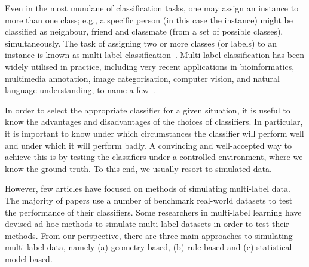\documentclass[review]{elsarticle}
\begin{document}
	Even in the most mundane of classification tasks, one may assign an instance to more than one class; e.g., a specific person (in this case the instance) might be classified as neighbour, friend and classmate (from a set of possible classes), simultaneously. The task of assigning two or more classes (or labels) to an instance is known as multi-label classification~\citep{Tsoumakas:07, de2009tutorial, zhang2014review, Gibaja:15}. Multi-label classification has been widely utilised in practice, including very recent applications in bioinformatics, multimedia annotation, image categorisation, computer vision, and natural language understanding, to name a few~\citep{Tsoumakas:07, zhang2014review, meng2016plant, li2016conditional, hou2016multi, ivasic2016two, wu2015multi, zhao2015multi, zhao2015joint, yang2016exploiting, li2015supervised, li2015centroid}.
	
	In order to select the appropriate classifier for a given situation, it is useful to know the advantages and disadvantages of the choices of classifiers. In particular, it is important to know under which circumstances the classifier will perform well and under which it will perform badly. A convincing and well-accepted way to achieve this is by testing the classifiers under a controlled environment, where we know the ground truth. To this end, we usually resort to simulated data.
	
	However, few articles have focused on methods of simulating multi-label data. The majority of papers use a number of benchmark real-world datasets to test the performance of their classifiers. Some researchers in multi-label learning have devised ad hoc methods to simulate multi-label datasets in order to test their methods.
	From our perspective, there are three main approaches to simulating multi-label data, namely (a) geometry-based, (b) rule-based and (c) statistical model-based.
	
\end{document}
